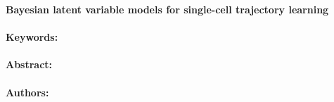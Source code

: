 \noindent
\large {\bf Bayesian latent variable models for single-cell trajectory learning} 


\normalsize 


\noindent \paragraph{Keywords:} 

\noindent \paragraph{Abstract:} 



\noindent \paragraph{Authors:} 

